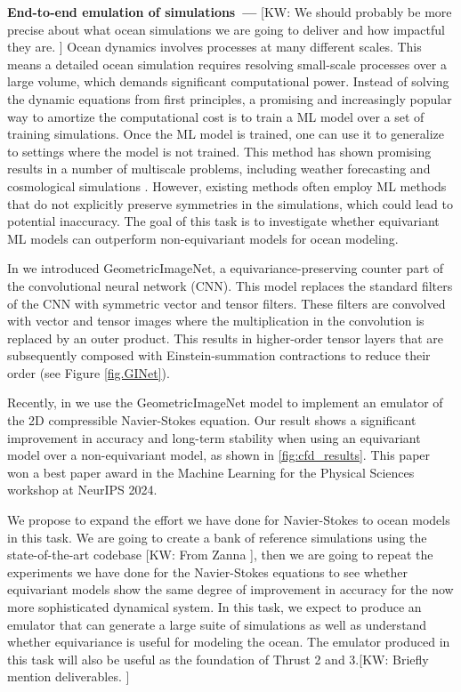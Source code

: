 \documentclass[11pt]{article}
\renewcommand{\paragraph}[1]{\medskip\par\noindent\textbf{#1~---}}
\newcommand{\kw}[1]{{\color{RoyalBlue}[KW: #1 ]}}
\begin{document}
\paragraph{End-to-end emulation of simulations}
\kw{We should probably be more precise about what ocean simulations we are going to deliver and how impactful they are.}
Ocean dynamics involves processes at many different scales. This means a detailed ocean simulation requires resolving small-scale processes over a large volume, which demands significant computational power.
Instead of solving the dynamic equations from first principles, a promising and increasingly popular way to amortize the computational cost is to train a ML model over a set of training simulations. Once the ML model is trained, one can use it to generalize to settings where the model is not trained. This method has shown promising results in a number of multiscale problems, including weather forecasting \cite{Pathak2022FourCastNetAG} and cosmological simulations \cite{CAMELS:2020cof}. However, existing methods often employ ML methods that do not explicitly preserve symmetries in the simulations, which could lead to potential inaccuracy. The goal of this task is to investigate whether equivariant ML models can outperform non-equivariant models for ocean modeling.

In \cite{Gregory2023EquivariantGC} we introduced GeometricImageNet, a equivariance-preserving counter part of the convolutional neural network (CNN). This model replaces the standard filters of the CNN with symmetric vector and tensor filters. These filters are convolved with vector and tensor images where the multiplication in the convolution is replaced by an outer product. This results in higher-order tensor layers that are subsequently composed with Einstein-summation contractions to reduce their order (see Figure \ref{fig.GINet}).  

Recently, in \cite{gregory2024robust} we use the GeometricImageNet model
to implement an emulator of the 2D compressible Navier-Stokes equation. Our result shows a significant improvement in accuracy and long-term stability when using an equivariant model over a non-equivariant model, as shown in \ref{fig:cfd_results}. This paper won a best paper award in the Machine Learning for the Physical Sciences workshop at NeurIPS 2024.

We propose to expand the effort we have done for Navier-Stokes to ocean models in this task. We are going to create a bank of reference simulations using the state-of-the-art codebase \kw{From Zanna}, then we are going to repeat the experiments we have done for the Navier-Stokes equations to see whether equivariant models show the same degree of improvement in accuracy for the now more sophisticated dynamical system. In this task, we expect to produce an emulator that can generate a large suite of simulations as well as understand whether equivariance is useful for modeling the ocean. The emulator produced in this task will also be useful as the foundation of Thrust 2 and 3.\kw{Briefly mention deliverables.}
\end{document}
